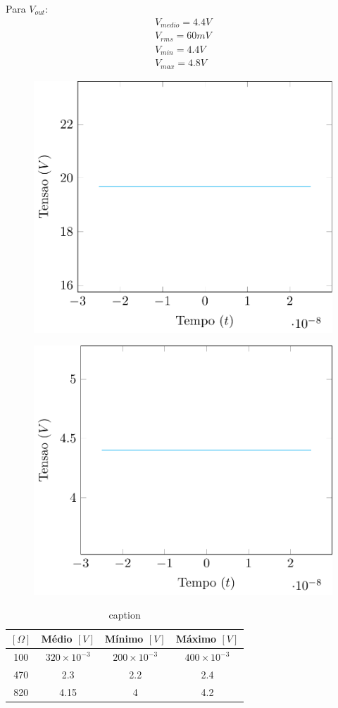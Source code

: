 \documentclass[12pt,a4paper]{article}
\begin{document}
Para $V_{out}$:
\begin{align*}
V_{medio} = 4.4 V \\
V_{rms} = 60 mV \\
V_{min} = 4.4 V \\
V_{max} = 4.8 V 
\end{align*}

\begin{figure}[htpb]
  \centering
  \includegraphics[width=0.8\linewidth]{./exp2/entrada_exp2.pdf}
  \caption{}
  \label{fig:./exp2/entrada_exp2}
\end{figure}
\begin{figure}[htpb]
  \centering
  \includegraphics[width=0.8\linewidth]{./exp2/saida_exp2.pdf}
  \caption{}
  \label{fig:./exp2/saida_exp2}
\end{figure}
\begin{table}[htpb]
  \centering
  \caption{caption}
  \label{tab:label}
  \begin{tabular}{c c c c}
    \toprule
    $[\Omega]$ & Médio $[V]$ & Mínimo $[V]$  &  Máximo $[V]$\\ \midrule
   100  & $320 \times 10^{-3}$ & $200 \times 10^{-3}$& $400 \times 10^{-3}$ \\\midrule
   470& 2.3& 2.2& 2.4 \\\midrule
   820& 4.15& 4& 4.2 \\ \bottomrule 
  \end{tabular}
\end{table}
\end{document}

